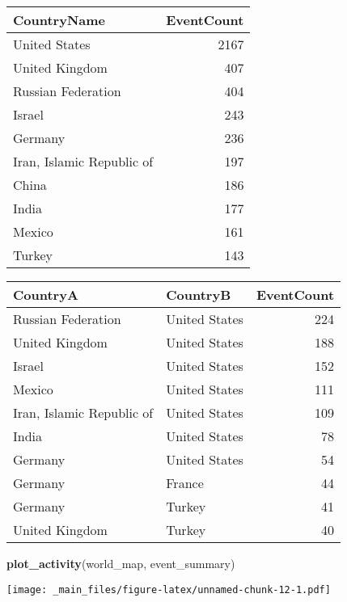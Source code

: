 \documentclass[]{article}
\newenvironment{Shaded}{\begin{snugshade}}{\end{snugshade}}
\newcommand{\KeywordTok}[1]{\textcolor[rgb]{0.13,0.29,0.53}{\textbf{{#1}}}}
\newcommand{\NormalTok}[1]{{#1}}
\begin{document}
\begin{tabular}{l|r}
\hline
CountryName & EventCount\\
\hline
United States & 2167\\
\hline
United Kingdom & 407\\
\hline
Russian Federation & 404\\
\hline
Israel & 243\\
\hline
Germany & 236\\
\hline
Iran, Islamic Republic of & 197\\
\hline
China & 186\\
\hline
India & 177\\
\hline
Mexico & 161\\
\hline
Turkey & 143\\
\hline
\end{tabular}

\begin{Shaded}
\end{Shaded}

\begin{tabular}{l|l|r}
\hline
CountryA & CountryB & EventCount\\
\hline
Russian Federation & United States & 224\\
\hline
United Kingdom & United States & 188\\
\hline
Israel & United States & 152\\
\hline
Mexico & United States & 111\\
\hline
Iran, Islamic Republic of & United States & 109\\
\hline
India & United States & 78\\
\hline
Germany & United States & 54\\
\hline
Germany & France & 44\\
\hline
Germany & Turkey & 41\\
\hline
United Kingdom & Turkey & 40\\
\hline
\end{tabular}

\begin{Shaded}
\begin{Highlighting}[]
\KeywordTok{plot_activity}\NormalTok{(world_map, event_summary)}
\end{Highlighting}
\end{Shaded}

\texttt{[image: \_main\_files/figure-latex/unnamed-chunk-12-1.pdf]}
\end{document}
